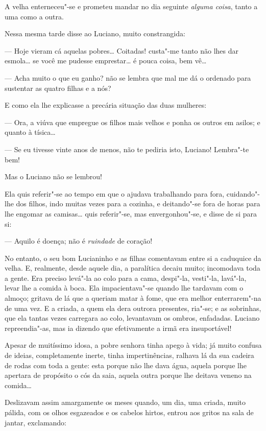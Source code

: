 A velha enterneceu"-se e prometeu mandar no dia seguinte \emph{alguma
coisa}, tanto a uma como a outra.

Nessa mesma tarde disse ao Luciano, muito constrangida:

--- Hoje vieram cá aquelas pobres\ldots{} Coitadas! custa"-me tanto não lhes
dar esmola\ldots{} se você me pudesse emprestar\ldots{} é pouca coisa, bem vê\ldots{}

--- Acha muito o que eu ganho? não se lembra que mal me dá o ordenado
para sustentar as quatro filhas e a nós?

E como ela lhe explicasse a precária situação das duas mulheres:

--- Ora, a viúva que empregue os filhos mais velhos e ponha os outros em
asilos; e quanto à tísica\ldots{}

--- Se eu tivesse vinte anos de menos, não te pediria isto, Luciano!
Lembra"-te bem!

Mas o Luciano não se lembrou!

Ela quis referir"-se ao tempo em que o ajudava trabalhando para fora,
cuidando"-lhe dos filhos, indo muitas vezes para a cozinha, e deitando"-se
fora de horas para lhe engomar as camisas\ldots{} quis referir"-se, mas
envergonhou"-se, e disse de si para si:

--- Aquilo é doença; não é \emph{ruindade} de coração!

No entanto, o seu bom Lucianinho e as filhas comentavam entre si a
caduquice da velha. E, realmente, desde aquele dia, a paralítica decaiu
muito; incomodava toda a gente. Era preciso levá"-la ao colo para a cama,
despi"-la, vesti"-la, lavá"-la, levar lhe a comida à boca. Ela
impacientava"-se quando lhe tardavam com o almoço; gritava de lá que a
queriam matar à fome, que era melhor enterrarem"-na de uma vez. E a
criada, a quem ela dera outrora presentes, ria"-se; e as sobrinhas, que
ela tantas vezes carregara ao colo, levantavam os ombros, enfadadas.
Luciano repreendia"-as, mas ia dizendo que efetivamente a irmã era
insuportável!

Apesar de muitíssimo idosa, a pobre senhora tinha apego à vida; já muito
confusa de ideias, completamente inerte, tinha impertinências, ralhava
lá da sua cadeira de rodas com toda a gente: esta porque não lhe dava
água, aquela porque lhe apertara de propósito o cós da saia, aquela
outra porque lhe deitava veneno na comida\ldots{}

Deslizavam assim amargamente os meses quando, um dia, uma criada, muito
pálida, com os olhos esgazeados e os cabelos hirtos, entrou aos gritos
na sala de jantar, exclamando:

